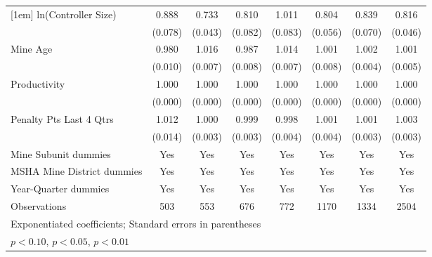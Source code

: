 {\begin{tabular}{l*{7}{c}}
[1em]
ln(Controller Size)      &       0.888         &       0.733\sym{***}&       0.810\sym{**} &       1.011         &       0.804\sym{***}&       0.839\sym{**} &       0.816\sym{***}\\
                         &     (0.078)         &     (0.043)         &     (0.082)         &     (0.083)         &     (0.056)         &     (0.070)         &     (0.046)         \\
[1em]
Mine Age                 &       0.980\sym{*}  &       1.016\sym{**} &       0.987         &       1.014\sym{*}  &       1.001         &       1.002         &       1.001         \\
                         &     (0.010)         &     (0.007)         &     (0.008)         &     (0.007)         &     (0.008)         &     (0.004)         &     (0.005)         \\
[1em]
Productivity             &       1.000         &       1.000         &       1.000\sym{***}&       1.000         &       1.000         &       1.000         &       1.000         \\
                         &     (0.000)         &     (0.000)         &     (0.000)         &     (0.000)         &     (0.000)         &     (0.000)         &     (0.000)         \\
[1em]
Penalty Pts Last 4 Qtrs  &       1.012         &       1.000         &       0.999         &       0.998         &       1.001         &       1.001         &       1.003         \\
                         &     (0.014)         &     (0.003)         &     (0.003)         &     (0.004)         &     (0.004)         &     (0.003)         &     (0.003)         \\
[1em]
Mine Subunit dummies     &         Yes         &         Yes         &         Yes         &         Yes         &         Yes         &         Yes         &         Yes         \\
[1em]
MSHA Mine District dummies&         Yes         &         Yes         &         Yes         &         Yes         &         Yes         &         Yes         &         Yes         \\
[1em]
Year-Quarter dummies     &         Yes         &         Yes         &         Yes         &         Yes         &         Yes         &         Yes         &         Yes         \\
\hline
Observations             &         503         &         553         &         676         &         772         &        1170         &        1334         &        2504         \\
\hline\hline
\multicolumn{8}{l}{\footnotesize Exponentiated coefficients; Standard errors in parentheses}\\
\multicolumn{8}{l}{\footnotesize \sym{*} \(p<0.10\), \sym{**} \(p<0.05\), \sym{***} \(p<0.01\)}\\
\end{tabular}
}
